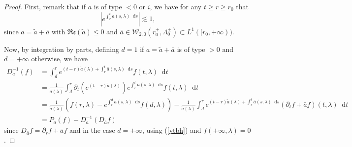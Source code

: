 \documentclass[11 pt]{amsart}
\theoremstyle{definition}
\theoremstyle{remark}
\numberwithin{equation}{section}
\newcommand{\dd}{\mathop{}\!\mathrm{d}}
\begin{document}
\begin{proof}
  First, remark that if $a$ is of type $< 0$ or $i$, we have for any $t
  \geqslant r \geqslant r_0$ that
  \begin{equation}
    \left| e^{\int_r^t a (s, \lambda)\dd s} \right| \lesssim 1, \label{ytbh}
  \end{equation}
  since $a = \widetilde{a} + \bar{a}$ with $\mathfrak{R}\mathfrak{e} (\widetilde{a})
  \leqslant 0$ and $\bar{a} \in \mathcal{W}_{2,
  0} (r_0^+, \Lambda_0^{\pm}) \subset L^1 ([r_0, + \infty )) $.

Now, by integration by parts, defining $d = 1$ if $a = \widetilde{a} + \bar{a}$
  is of type $> 0$ and $d = + \infty$ otherwise, we have
  \begin{align*}
D_a^{- 1} (f) & = \int_d^r e^{(t - r) \widetilde{a} (\lambda) + \int_r^t
    \bar{a} (s, \lambda)\dd s} f (t, \lambda)\dd t\\
    & =  \frac{1}{\widetilde{a} (\lambda)} \int_d^r \partial_t (e^{(t - r)
    \widetilde{a} (\lambda)}) e^{\int_r^t \bar{a} (s, \lambda)\dd s} f (t, \lambda)\dd t\\
    & =  \frac{1}{\widetilde{a} (\lambda)} \left( f (r, \lambda) - e^{\int_r^d a
    (s, \lambda)\dd s} f (d, \lambda) \right) -  \frac{1}{\widetilde{a} (\lambda)} \int_d^r e^{(t - r) \widetilde{a}
    (\lambda) + \int_r^t \bar{a} (s, \lambda)\dd s} (\partial_t f + \bar{a} f)
    (t, \lambda)\dd t\\
    & =  P_a (f) - D_a^{- 1} (D_{\bar{a} } f)
  \end{align*}
  since $D_{\bar{a} } f = \partial_r f + \bar{a} f$ and in the case $d = +
  \infty$, using (\ref{ytbh}) and $f (+ \infty, \lambda) = 0$.
  

\end{proof}
\end{document}
